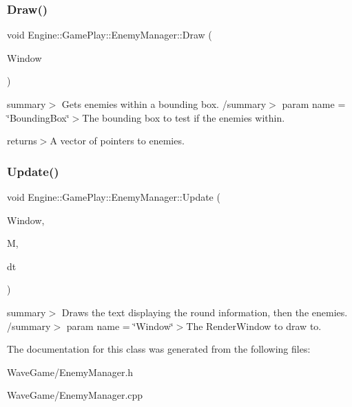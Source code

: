 \subsubsection{\texorpdfstring{Draw()}{Draw()}}
{\footnotesize\ttfamily void Engine\+::\+Game\+Play\+::\+Enemy\+Manager\+::\+Draw (\begin{DoxyParamCaption}\item[{Render\+Window $\ast$}]{Window }\end{DoxyParamCaption})}

summary$>$ Gets enemies within a bounding box. /summary$>$ param name = \char`\"{}\+Bounding\+Box\char`\"{}$>$The bounding box to test if the enemies within.

returns$>$A vector of pointers to enemies.\mbox{\label{class_engine_1_1_game_play_1_1_enemy_manager_a545df3d86d86905d5db1e4bb8f327137}} 
\subsubsection{\texorpdfstring{Update()}{Update()}}
{\footnotesize\ttfamily void Engine\+::\+Game\+Play\+::\+Enemy\+Manager\+::\+Update (\begin{DoxyParamCaption}\item[{Render\+Window $\ast$}]{Window,  }\item[{\hyperlink{class_engine_1_1_core_1_1_map}{Map}}]{M,  }\item[{float}]{dt }\end{DoxyParamCaption})}

summary$>$ Draws the text displaying the round information, then the enemies. /summary$>$ param name = \char`\"{}\+Window\char`\"{}$>$The Render\+Window to draw to.

The documentation for this class was generated from the following files\+:\begin{DoxyCompactItemize}
\item 
Wave\+Game/Enemy\+Manager.\+h\item 
Wave\+Game/Enemy\+Manager.\+cpp\end{DoxyCompactItemize}
